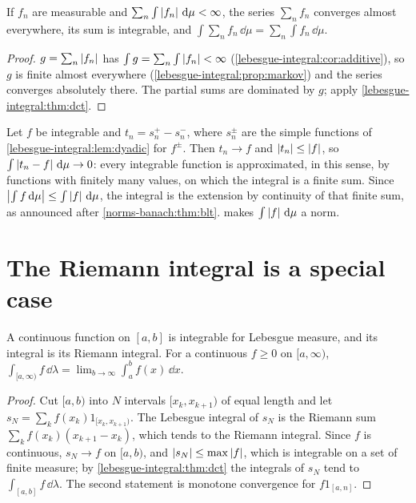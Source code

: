 \begin{notechapter}
\begin{corollary}[Series]\label{lebesgue-integral:cor:series}
If $f_n$ are measurable and
$\sum_n\int\left|f_n\right|\,\mathrm{d}\mu < \infty$, the series $\sum_nf_n$ converges
almost everywhere, its sum is integrable, and
$\int\sum_nf_n\,\dd\mu = \sum_n\int f_n\,\dd\mu$.
\end{corollary}

\begin{proof}
$g = \sum_n\left|f_n\right|$ has
$\int g = \sum_n\int\left|f_n\right| < \infty$
(\cref{lebesgue-integral:cor:additive}), so $g$ is finite almost
everywhere (\cref{lebesgue-integral:prop:markov}) and the series
converges absolutely there. The partial sums are dominated by $g$;
apply \cref{lebesgue-integral:thm:dct}.
\end{proof}

\begin{remark}
\label{lebesgue-integral:rem:extension}
Let $f$ be integrable and $t_n = s_n^+ - s_n^-$, where $s_n^\pm$ are the
simple functions of \cref{lebesgue-integral:lem:dyadic} for $f^\pm$.
Then $t_n\to f$ and $\left|t_n\right|\leq\left|f\right|$, so
$\int\left|t_n - f\right|\,\mathrm{d}\mu\to0$: every integrable function is
approximated, in this sense, by functions with finitely many values, on
which the integral is a finite sum. Since
$\left|\int f\,\mathrm{d}\mu\right|\leq\int\left|f\right|\,\mathrm{d}\mu$, the integral is the
extension by continuity of that finite sum, as announced after
\cref{norms-banach:thm:blt}.  makes $\int\left|f\right|\,\mathrm{d}\mu$
a norm.
\end{remark}

\section{The Riemann integral is a special case}
\label{lebesgue-integral:sec:riemann}

\begin{theorem}\label{lebesgue-integral:thm:riemann}
A continuous function on $[a, b]$ is integrable for Lebesgue measure,
and its integral is its Riemann integral. For a continuous
$f\geq0$ on $[a, \infty)$,
$\int_{[a, \infty)}f\,\dd\lambda = \lim_{b\to\infty}\int_a^bf(x)\,\dd x$.
\end{theorem}

\begin{proof}
Cut $[a, b)$ into $N$ intervals $[x_k, x_{k+1})$ of equal length and let
$s_N = \sum_kf(x_k)1_{[x_k, x_{k+1})}$. The Lebesgue integral of $s_N$ is
the Riemann sum $\sum_kf(x_k)(x_{k+1} - x_k)$, which tends to the
Riemann integral. Since $f$ is continuous, $s_N\to f$ on $[a, b)$, and
$\left|s_N\right|\leq\max\left|f\right|$, which is integrable on a set of finite
measure; by \cref{lebesgue-integral:thm:dct} the integrals of $s_N$ tend
to $\int_{[a, b]}f\,\dd\lambda$. The second statement is monotone
convergence for $f1_{[a, n]}$.
\end{proof}


\end{notechapter}
